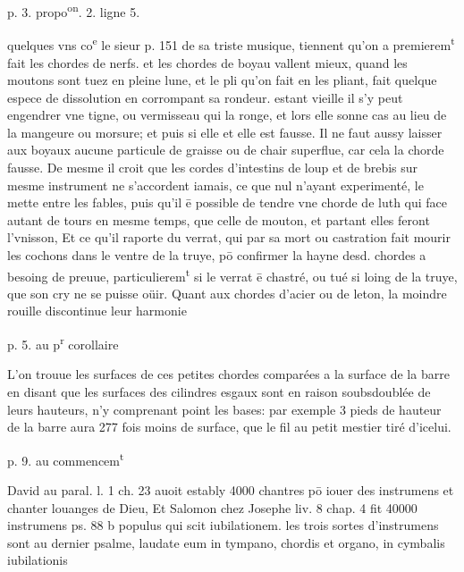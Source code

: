 \documentclass[11pt,a4paper]{article}
\begin{document}
p. 3. propo\textsuperscript{on}. 2. ligne 5.

quelques vns co\textsuperscript{e} le sieur p. 151 de sa triste musique, tiennent qu'on a premierem\textsuperscript{t} fait les chordes de nerfs. et les chordes de boyau vallent mieux, quand les moutons sont tuez en pleine lune, et le pli qu'on fait en les pliant, fait quelque espece de dissolution en corrompant sa rondeur. estant vieille il s'y peut engendrer vne tigne, ou vermisseau qui la ronge, et lors elle sonne cas au lieu de la mangeure ou morsure; et puis si elle  et  elle est fausse. Il ne faut aussy laisser aux boyaux aucune particule de graisse ou de chair superflue, car cela \ill{} la chorde fausse. De mesme il croit que les cordes d'intestins de loup et de brebis sur mesme instrument ne s'accordent iamais, ce que nul n'ayant experimenté, \ill{} le mette entre les fables, puis qu'il ē possible de tendre vne chorde de luth qui face autant de tours en mesme temps, que celle de mouton, et partant elles feront l'vnisson, Et ce qu'il raporte du verrat, qui par sa mort ou castration fait mourir les cochons dans le ventre de la truye, pō confirmer la hayne desd. chordes a besoing de preuue, particulierem\textsuperscript{t} si le verrat ē chastré, ou tué si  loing de la truye, que son cry ne se puisse oüir. Quant aux chordes d'acier ou de leton, la moindre rouille discontinue leur harmonie

p. 5. au p\textsuperscript{r} corollaire

L'on trouue les surfaces de ces petites chordes comparées a la surface de la barre en disant que les surfaces des cilindres esgaux sont en raison soubsdoublée de leurs hauteurs, n'y comprenant point les bases: par exemple 3 pieds de hauteur de la barre aura 277 fois moins de surface, que le fil au petit mestier tiré d'icelui.


p. 9. au commencem\textsuperscript{t}

David au paral. l. 1 ch. 23 auoit estably 4000 chantres pō iouer des instrumens et chanter \ill{} louanges de Dieu, Et Salomon chez Josephe liv. 8 chap. 4 fit 40000 instrumens ps. 88 b\ill{} populus qui scit iubilationem. les trois sortes d'instrumens sont au dernier psalme, laudate eum in tympano, chordis et organo, in cymbalis iubilationis
\end{document}

